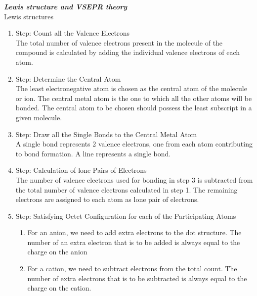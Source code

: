 \documentclass[./chem_exercises.tex]{subfiles}
\begin{document}
\begin{multicols}{2}
\textit{\textbf{Lewis structure and VSEPR theory  } }\\
Lewis structures
\begin{enumerate}
\item Step: Count all the Valence Electrons\\
The total number of valence electrons present in
the molecule of the compound is calculated by adding
the individual valence electrons of each atom.

\item Step: Determine the Central Atom\\
The least electronegative atom is chosen as the central atom of the molecule or ion.
The central metal atom is the one to which all the other atoms will be bonded.
The central atom to be chosen should possess the least subscript in a given molecule.

\item Step: Draw all the Single Bonds to the Central Metal Atom\\
A single bond represents 2 valence electrons, one from each atom contributing to bond formation.
A line represents a single bond.

\item Step: Calculation of lone Pairs of Electrons\\
The number of valence electrons used for bonding in step 3 is subtracted from the total number of valence electrons calculated in step 1.
The remaining electrons are assigned to each atom as lone pair of electrons.

\item Step: Satisfying Octet Configuration for each of the Participating Atoms\\

\begin{enumerate}[label=(\alph*)]
\item For an anion, we need to add extra electrons to the dot structure.
The number of an extra electron that is to be added is always equal to the charge on the anion

\item For a cation, we need to subtract electrons from the total count. 
The number of extra electrons that is to be subtracted is always equal to the charge on the cation.
\end{enumerate}


\end{enumerate}
\end{multicols}
\end{document}
